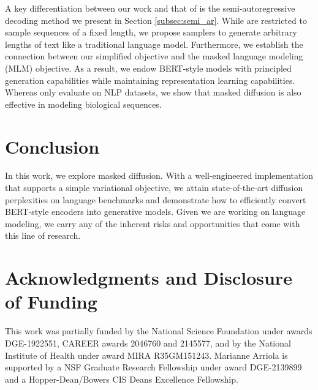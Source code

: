 \documentclass{article} %
\begin{document}
{A key differentiation between our work and that of \citet{shi2024simplified, ou2024absorbingdiscretediffusionsecretly} is the semi-autoregressive decoding method we present in Section \ref{subsec:semi_ar}.
While \citep{shi2024simplified, ou2024absorbingdiscretediffusionsecretly} are restricted to sample sequences of a fixed length, we propose samplers to generate arbitrary lengths of text like a traditional language model.
Furthermore, we establish the connection between our simplified objective and the masked language modeling (MLM) objective.
As a result, we endow BERT-style models with principled generation capabilities while maintaining representation learning capabilities.
Whereas \citep{shi2024simplified, ou2024absorbingdiscretediffusionsecretly} only evaluate on NLP datasets, we show that masked diffusion is also effective in modeling biological sequences.






\section{Conclusion}
In this work, we explore masked diffusion. 
With a well-engineered implementation that supports a simple variational objective, we attain state-of-the-art diffusion perplexities on language benchmarks and demonstrate how to efficiently convert BERT-style encoders into generative models. Given we are working on language modeling, we carry any of the inherent risks and opportunities that come with this line of research.

\section*{Acknowledgments and Disclosure of Funding}
This work was partially funded by the National Science Foundation under awards DGE-1922551,
CAREER awards 2046760 and 2145577,  and by the National Institute of Health under award MIRA
R35GM151243. Marianne Arriola is supported by a NSF Graduate Research Fellowship under award DGE-2139899 and a Hopper-Dean/Bowers CIS Deans Excellence Fellowship.




\newpage
\appendix




















}
\end{document}

